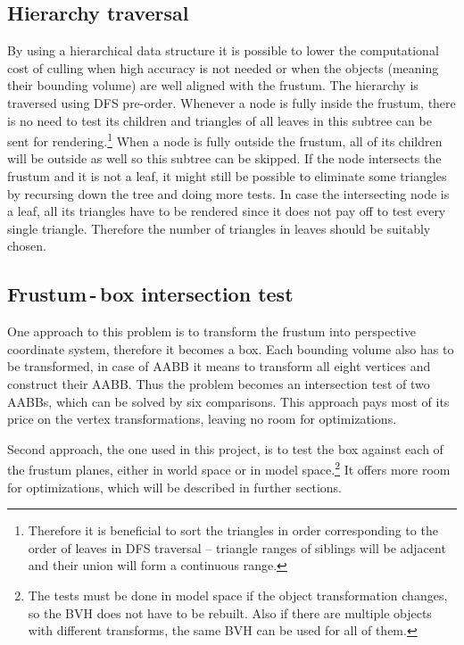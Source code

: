\documentclass[report,11pt]{elsarticle}
\begin{document}
\subsection{Hierarchy traversal}
By using a hierarchical data structure it is possible to lower the computational cost of culling when high accuracy is not needed or when the objects (meaning their bounding volume) are well aligned with the frustum. The hierarchy is traversed using DFS pre-order. Whenever a node is fully inside the frustum, there is no need to test its children and triangles of all leaves in this subtree can be sent for rendering.\footnote{Therefore it is beneficial to sort the triangles in order corresponding to the order of leaves in DFS traversal -- triangle ranges of siblings will be adjacent and their union will form a continuous range.} When a node is fully outside the frustum, all of its children will be outside as well so this subtree can be skipped. If the node intersects the frustum and it is not a leaf, it might still be possible to eliminate some triangles by recursing down the tree and doing more tests. In case the intersecting node is a leaf, all its triangles have to be rendered since it does not pay off to test every single triangle. Therefore the number of triangles in leaves should be suitably chosen.

\subsection{Frustum\,-\,box intersection test}
One approach to this problem is to transform the frustum into perspective coordinate system, therefore it becomes a box. Each bounding volume also has to be transformed, in case of AABB it means to transform all eight vertices and construct their AABB. Thus the problem becomes an intersection test of two AABBs, which can be solved by six comparisons. This approach pays most of its price on the vertex transformations, leaving no room for optimizations.

Second approach, the one used in this project, is to test the box against each of the frustum planes, either in world space or in model space.\footnote{The tests must be done in model space if the object transformation changes, so the BVH does not have to be rebuilt. Also if there are multiple objects with different transforms, the same BVH can be used for all of them.} It offers more room for optimizations, which will be described in further sections.
\end{document}
